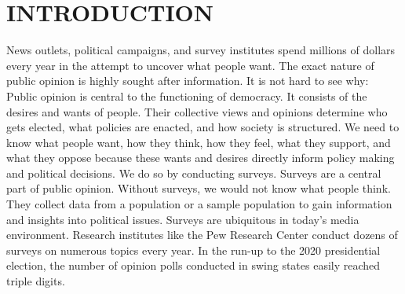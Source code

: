 \documentclass[12pt,econ]{sources/authesis}
\begin{document}
\begin{frontmatter}





\listoftables

\listoffigures

\tableofcontents


\end{frontmatter}

\hypertarget{intro}{%
\chapter{INTRODUCTION}\label{intro}}

News outlets, political campaigns, and survey institutes spend millions of dollars every year in the attempt to uncover what people want. The exact nature of public opinion is highly sought after information. It is not hard to see why: Public opinion is central to the functioning of democracy. It consists of the desires and wants of people. Their collective views and opinions determine who gets elected, what policies are enacted, and how society is structured. We need to know what people want, how they think, how they feel, what they support, and what they oppose because these wants and desires directly inform policy making and political decisions. We do so by conducting surveys. Surveys are a central part of public opinion. Without surveys, we would not know what people think. They collect data from a population or a sample population to gain information and insights into political issues. Surveys are ubiquitous in today's media environment. Research institutes like the Pew Research Center conduct dozens of surveys on numerous topics every year. In the run-up to the 2020 presidential election, the number of opinion polls conducted in swing states easily reached triple digits.
\end{document}
